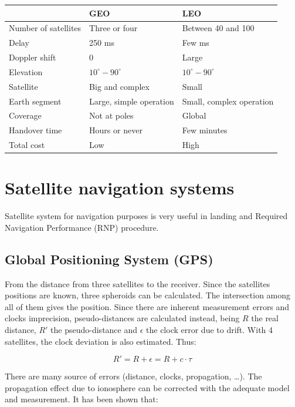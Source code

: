 \documentclass[../main.tex]{subfiles}
\begin{document}
\begin{tabular}{|l|l|l|}
	\hline
							& GEO						& LEO \\
	\hline
	Number of satellites	& Three or four				& Between 40 and 100 \\
	\hline
	Delay					& 250 ms					& Few ms \\
	\hline
	Doppler shift			& 0							& Large \\
	\hline
	Elevation				& $10^{\circ} - 90^{\circ}$					& $10^{\circ} - 90^{\circ}$ \\
	\hline
	Satellite				& Big and complex			& Small \\
	\hline
	Earth segment			& Large, simple operation	& Small, complex operation \\
	\hline
	Coverage				& Not at poles				& Global \\
	\hline
	Handover time			& Hours or never			& Few minutes \\
	\hline
	Total cost				& Low						& High \\
	\hline
\end{tabular}

\section{Satellite navigation systems}

Satellite system for navigation purposes is very useful in landing and Required Navigation Performance (RNP) procedure.

\subsection{Global Positioning System (GPS)}

From the distance from three satellites to the receiver. Since the satellites positions are known, three spheroids can be calculated. The intersection among all of them gives the position. Since there are inherent measurement errors and clocks imprecision, pseudo-distances are calculated instead, being $R$ the real distance, $R'$ the pseudo-distance and $\epsilon$ the clock error due to drift. With 4 satellites, the clock deviation is also estimated. Thus:

$$
	R' = R + \epsilon = R + c \cdot \tau
$$

There are many source of errors (distance, clocks, propagation, \ldots). The propagation effect due to ionosphere can be corrected with the adequate model and measurement. It has been shown that:
\end{document}
